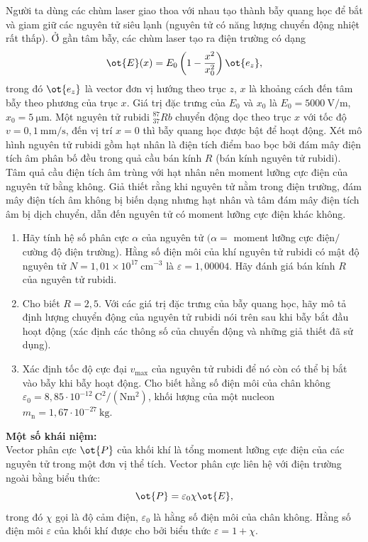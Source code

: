 \begin{vd}
  Người ta dùng các chùm laser giao thoa với nhau tạo thành bẫy quang học để bắt và giam giữ các nguyên tử siêu lạnh (nguyên tử có năng lượng chuyển động nhiệt rất thấp). Ở gần tâm bẫy, các chùm laser tạo ra điện trường có dạng
\[\ot{E}(x) = E_{0}\left(1-\dfrac{x^{2}}{x_{0}^{2}}\right) \ot{e_z},\]
trong đó $\ot{e_z}$ là vector đơn vị hướng theo trục $z$, $x$ là khoảng cách đến tâm bẫy theo phương của trục $x$. Giá trị đặc trưng của $E_{0}$ và $x_{0}$ là $E_{0}=5000 \mathrm{{~V} / {m}}$, $x_{0} = 5  ~\mathrm{\mu m}$. Một nguyên tử rubidi ${ }_{37}^{87} {Rb}$ chuyển động dọc theo trục $x$ với tốc độ $v = 0,1 \mathrm{~mm} / \mathrm{s}$, đến vị trí $x=0$ thì bẫy quang học được bật để hoạt động. Xét mô hình nguyên tử rubidi gồm hạt nhân là điện tích điểm bao bọc bởi đám mây điện tích âm phân bố đều trong quả cầu bán kính $R$ (bán kính nguyên tử rubidi). Tâm quả cầu điện tích âm trùng với hạt nhân nên moment lưỡng cực điện của nguyên tử bằng không. Giả thiết rằng khi nguyên tử nằm trong điện trường, đám mây điện tích âm không bị biến dạng nhưng hạt nhân và tâm đám mây điện tích âm bị dịch chuyển, dẫn đến nguyên tử có moment lưỡng cực điện khác không.
\begin{enumerate}[1)]
    \item Hãy tính hệ số phân cực $\alpha$ của nguyên tử $(\alpha=$ moment lưỡng cực điện$/$cường độ điện trường). Hằng số điện môi của khí nguyên tử rubidi có mật độ nguyên tử $N=1,01 \times 10^{17} \mathrm{~cm^{-3}}$ là $\varepsilon = 1,00004$. Hãy đánh giá bán kính $R$ của nguyên tử rubidi.
    \item Cho biết ${R}=2,5$. Với các giá trị đặc trưng của bẫy quang học, hãy mô tả định lượng chuyển động của nguyên tử rubidi nói trên sau khi bẫy bắt đầu hoạt động (xác định các thông số của chuyển động và những giả thiết đã sử dụng).
    \item Xác định tốc độ cực đại $v_{\max }$ của nguyên tử rubidi để nó còn có thể bị bắt vào bẫy khi bẫy hoạt động. Cho biết hằng số điện môi của chân không $\varepsilon_{0} = 8,85 \cdot 10^{-12} ~\mathrm{C^2 / \left(Nm^2\right)}$, khối lượng của một nucleon $m_{\mathrm{n}} = 1,67 \cdot 10^{-27} \mathrm{~kg}$.
\end{enumerate}
\textbf{Một số khái niệm:} \\
Vector phân cực $\ot{P}$ của khối khí là tổng moment lưỡng cực điện của các nguyên tử trong một đơn vị thể tích. Vector phân cực liên hệ với điện trường ngoài bằng biểu thức:
\[
\ot{P}=\varepsilon_{0} \chi \ot{E},
\]
trong đó $\chi$ gọi là độ cảm điện, $\varepsilon_{0}$ là hằng số điện môi của chân không. Hằng số điện môi $\varepsilon$ của khối khí được cho bởi biểu thức $\varepsilon=1+\chi$.
\end{vd}
